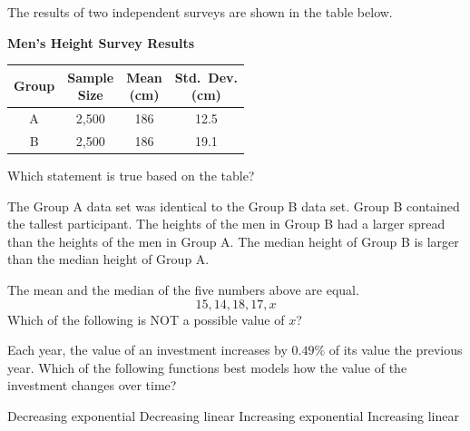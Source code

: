 \question[1]
The results of two independent surveys are shown in the table below.
\vspace{0.5em}
\begin{center}
  \renewcommand{\arraystretch}{1.3}
  \setlength{\tabcolsep}{0.5em}
  {\textbf{Men's Height Survey Results}\par}
  \vspace{0.35em}
  \begin{tabular}{|c|c|c|c|}
    \hline
    \rowcolor[HTML]{E0E0E0}
    \textbf{Group} &
    \makecell{\textbf{Sample}\\\textbf{Size}} &
    \makecell{\textbf{Mean}\\\textbf{(cm)}} &
    \makecell{\textbf{Std.\ Dev.}\\\textbf{(cm)}} \\
    \hline
    A & 2,500 & 186 & 12.5 \\
    B & 2,500 & 186 & 19.1 \\
    \hline
  \end{tabular}
\end{center}
Which statement is true based on the table?
\begin{choices}
  \choice The Group A data set was identical to the Group B data set.
  \choice Group B contained the tallest participant.
  \CorrectChoice The heights of the men in Group B had a larger spread than the heights of the men in Group A.
  \choice The median height of Group B is larger than the median height of Group A.
\end{choices}

\question[1]
The mean and the median of the five numbers above are equal.
\[
  15,14,18,17, x
\]
Which of the following is NOT a possible value of $x$?
\begin{choices}
\end{choices}



\question[1]
Each year, the value of an investment increases by $0.49\%$ of its value the previous year. Which of the following functions best models how the value of the investment changes over time?
\begin{choices}
  \choice Decreasing exponential
  \choice Decreasing linear
  \CorrectChoice Increasing exponential
  \choice Increasing linear
\end{choices}



\newpage




